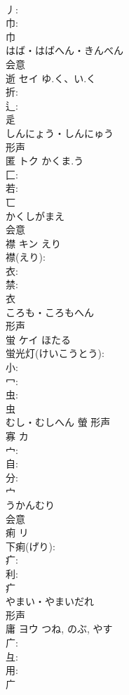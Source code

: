 \documentclass[8pt]{extreport}
\begin{document}
\begin{CJK}{UTF8}{min}
\\	丿: 
\\	巾: 
\\	巾	
\\	はば・はばへん・きんべん	
\\	会意 
\\	逝	セイ	ゆ.く、い.く		
\\	折: 
\\	辶: 
\\	辵	
\\	しんにょう・しんにゅう	
\\	形声 
\\	匿	トク	かくま.う		
\\	匚: 
\\	若: 
\\	匸	
\\	かくしがまえ	
\\	会意 
\\	襟	キン	えり		
\\	襟(えり): 
\\	衣: 
\\	禁: 
\\	衣	
\\	ころも・ころもへん	
\\	形声 
\\	蛍	ケイ	ほたる		
\\	蛍光灯(けいこうとう): 
\\	小: 
\\	冖: 
\\	虫: 
\\	虫	
\\	むし・むしへん	螢	形声 
\\	寡	カ			
\\	宀: 
\\	自: 
\\	分: 
\\	宀	
\\	うかんむり	
\\	会意 
\\	痢	リ			
\\	下痢(げり): 
\\	疒: 
\\	利: 
\\	疒	
\\	やまい・やまいだれ	
\\	形声 
\\	庸	ヨウ		つね, のぶ, やす	
\\	广: 
\\	彑: 
\\	用: 
\\	广	

\end{CJK}
\end{document}
